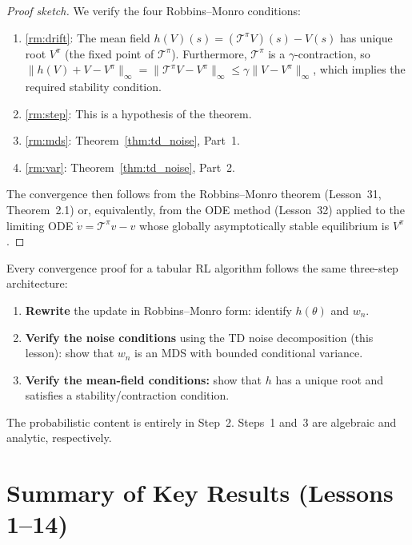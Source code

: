 \documentclass[11pt,a4paper]{article}
\begin{document}
\begin{proof}[Proof sketch]
We verify the four Robbins--Monro conditions:
\begin{enumerate}
  \item \ref{rm:drift}: The mean field
    $h(V)(s) = (\mathcal{T}^\pi V)(s) - V(s)$ has unique
    root $V^\pi$ (the fixed point of $\mathcal{T}^\pi$).
    Furthermore, $\mathcal{T}^\pi$ is a
    $\gamma$-contraction, so
    $\|h(V) + V - V^\pi\|_\infty
    = \|\mathcal{T}^\pi V - V^\pi\|_\infty
    \leq \gamma \|V - V^\pi\|_\infty$,
    which implies the required stability condition.
  \item \ref{rm:step}: This is a hypothesis of the theorem.
  \item \ref{rm:mds}: Theorem~\ref{thm:td_noise}, Part~1.
  \item \ref{rm:var}: Theorem~\ref{thm:td_noise}, Part~2.
\end{enumerate}
The convergence then follows from the Robbins--Monro theorem
(Lesson~31, Theorem~2.1) or, equivalently, from the ODE
method (Lesson~32) applied to the limiting ODE
$\dot{v} = \mathcal{T}^\pi v - v$ whose globally
asymptotically stable equilibrium is $V^\pi$.
\end{proof}

\begin{rlconnection}[title={The Architecture of RL Convergence Proofs}]
Every convergence proof for a tabular RL algorithm follows
the same three-step architecture:
\begin{enumerate}[nosep]
  \item \textbf{Rewrite} the update in Robbins--Monro form:
    identify $h(\theta)$ and $w_n$.
  \item \textbf{Verify the noise conditions} using the TD
    noise decomposition (this lesson): show that $w_n$ is
    an MDS with bounded conditional variance.
  \item \textbf{Verify the mean-field conditions:}
    show that $h$ has a unique root and satisfies a
    stability/contraction condition.
\end{enumerate}
The probabilistic content is entirely in Step~2.
Steps~1 and~3 are algebraic and analytic, respectively.
\end{rlconnection}


\section{Summary of Key Results (Lessons 1--14)}
\label{sec:summary_table}
\end{document}
